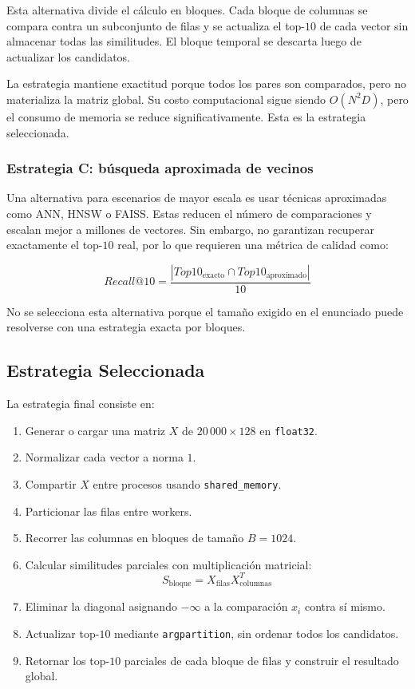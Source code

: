 \documentclass[10pt,a4paper]{article}
\begin{document}
Esta alternativa divide el c\'alculo en bloques. Cada bloque de columnas se
compara contra un subconjunto de filas y se actualiza el top-$10$ de cada vector
sin almacenar todas las similitudes. El bloque temporal se descarta luego de
actualizar los candidatos.

La estrategia mantiene exactitud porque todos los pares son comparados, pero no
materializa la matriz global. Su costo computacional sigue siendo $O(N^2D)$,
pero el consumo de memoria se reduce significativamente. Esta es la estrategia
seleccionada.

\subsubsection{Estrategia C: b\'usqueda aproximada de vecinos}

Una alternativa para escenarios de mayor escala es usar t\'ecnicas aproximadas
como ANN, HNSW o FAISS. Estas reducen el n\'umero de comparaciones y escalan
mejor a millones de vectores. Sin embargo, no garantizan recuperar exactamente
el top-$10$ real, por lo que requieren una m\'etrica de calidad como:

\[
Recall@10 =
\frac{|Top10_{\text{exacto}} \cap Top10_{\text{aproximado}}|}{10}
\]

No se selecciona esta alternativa porque el tama\~no exigido en el enunciado
puede resolverse con una estrategia exacta por bloques.

\subsection{Estrategia Seleccionada}

La estrategia final consiste en:

\begin{enumerate}
    \item Generar o cargar una matriz $X$ de $20\,000 \times 128$ en
        \texttt{float32}.
    \item Normalizar cada vector a norma $1$.
    \item Compartir $X$ entre procesos usando \texttt{shared\_memory}.
    \item Particionar las filas entre workers.
    \item Recorrer las columnas en bloques de tama\~no $B=1024$.
    \item Calcular similitudes parciales con multiplicaci\'on matricial:
        \[
        S_{\text{bloque}} = X_{\text{filas}}X_{\text{columnas}}^T
        \]
    \item Eliminar la diagonal asignando $-\infty$ a la comparaci\'on
        $x_i$ contra s\'i mismo.
    \item Actualizar top-$10$ mediante \texttt{argpartition}, sin ordenar todos
        los candidatos.
    \item Retornar los top-$10$ parciales de cada bloque de filas y construir
        el resultado global.
\end{enumerate}
\end{document}
